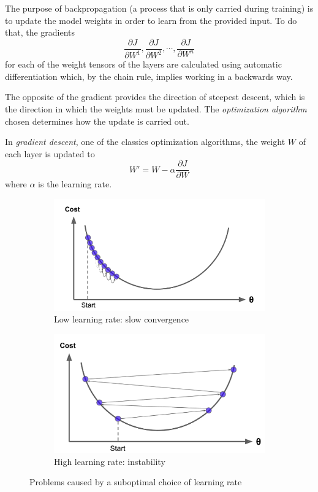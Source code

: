 The purpose of backpropagation (a process that is only carried during training) is to update the model weights in order to learn from the provided input. To do that, the gradients \[ \frac{\partial J}{\partial W^1}, \frac{\partial J}{\partial W^2}, \cdots, \frac{\partial J}{\partial W^n} \] for each of the weight tensors of the layers are calculated using automatic differentiation which, by the chain rule, implies working in a backwards way.

The opposite of the gradient provides the direction of steepest descent, which is the direction in which the weights must be updated. The \textit{optimization algorithm} chosen determines how the update is carried out.

In \textit{gradient descent}, one of the classics optimization algorithms, the weight \( W \) of each layer is updated to \[ W' = W - \alpha \frac{\partial J}{\partial W} \] where \( \alpha \) is the learning rate.

\begin{figure}[tb]
     \begin{subfigure}[b]{0.49\textwidth}
         \centering
         \includegraphics[width=\textwidth]{figures/chapter2/low_lr.png}
         \caption{Low learning rate: slow convergence}
        \label{fig:low_learning_rate}
    \end{subfigure}
    \hfill
    \begin{subfigure}[b]{0.49\textwidth}
         \centering
         \includegraphics[width=\textwidth]{figures/chapter2/high_lr.png}
         \caption{High learning rate: instability}
         \label{fig:high_learning_rate}
     \end{subfigure}
    \caption{Problems caused by a suboptimal choice of learning rate \cite{geron2022hands}}
    \label{fig:learning_rate}
\end{figure}

